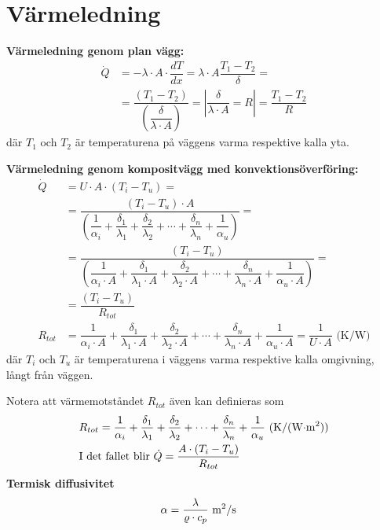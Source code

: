 \section*{Värmeledning}
\textbf{Värmeledning genom plan vägg: }
 \begin{align*}
	\dot{Q} & = - \lambda \cdot A \cdot \dfrac{dT}{dx} = \lambda \cdot A \dfrac{T_1-T_2}{\delta} = \\
		& = \dfrac{(T_1-T_2)}{\left(\dfrac{\delta}{\lambda \cdot A}\right)}  = \left| \dfrac{\delta}{\lambda \cdot A}=R \right| =\dfrac{T_1-T_2}{R}
 \end{align*}
 där $T_1$ och $T_2$ är temperaturena på väggens varma respektive kalla yta. \par
 \textbf{Värmeledning genom kompositvägg med konvektionsöverföring:} 
	\begin{align*}
		\dot{Q} &= U \cdot A \cdot (T_i - T_u) =\\
		& = \dfrac{(T_i-T_u) \cdot A}{\left(\dfrac{1}{\alpha_i}+\dfrac{\delta_1}{\lambda_1}+ \dfrac{\delta_2}{\lambda_2}+\cdots +\dfrac{\delta_n}{\lambda_n}+\dfrac{1}{\alpha_u}\right)} = \\
		 & = \dfrac{(T_i-T_u)}{\left(\dfrac{1}{\alpha_i \cdot A}+\dfrac{\delta_1}{\lambda_1 \cdot A}+ \dfrac{\delta_2}{\lambda_2 \cdot A}+\cdots +\dfrac{\delta_n}{\lambda_n\cdot A} +\dfrac{1}{\alpha_u \cdot A}\right)} = \\
		 & = \dfrac{(T_i-T_u)}{R_{tot}}\\
R_{tot} &= \dfrac{1}{\alpha_i \cdot A}+\dfrac{\delta_1}{\lambda_1 \cdot A}+ \dfrac{\delta_2}{\lambda_2 \cdot A}+\cdots +\dfrac{\delta_n}{\lambda_n\cdot A} +\dfrac{1}{\alpha_u \cdot A} = \dfrac{1}{U \cdot A} \text{ (K/W)}
	\end{align*}
 där $T_i$ och $T_u$ är temperaturena i väggens varma respektive kalla omgivning, långt från väggen. \par
 Notera att värmemotståndet $R_{tot}$ även kan definieras som
	\begin{align*}
	& R_{tot} =  \dfrac{1}{\alpha_i}+\dfrac{\delta_1}{\lambda_1}+ \dfrac{\delta_2}{\lambda_2}+\cdots +\dfrac{\delta_n}{\lambda_n}+\dfrac{1}{\alpha_u} \text{ (K/(W$\cdot$m\textsuperscript{2}))} \\
	& \text{I det fallet blir } \dot{Q} = \dfrac{A \cdot ( T_i - T_u )}{R_{tot}}
	\end{align*}
 \textbf{Termisk diffusivitet}
 \begin{align*}
&\alpha = \dfrac{\lambda}{\varrho \cdot c_p} \text{ m\textsuperscript{2}/s}
 \end{align*}
